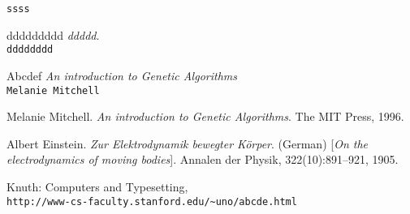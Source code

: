 \begin{thebibliography}{99}

  
\texttt{ssss}

ddddddddd
\textit{ddddd}.\\
\texttt{dddddddd}

Abcdef
\textit{An introduction to Genetic Algorithms}\\
\texttt{Melanie Mitchell}

Melanie Mitchell. 
\textit{An introduction to Genetic Algorithms}. 
The MIT Press, 1996.

Albert Einstein. 
\textit{Zur Elektrodynamik bewegter K{\"o}rper}. (German) 
[\textit{On the electrodynamics of moving bodies}]. 
Annalen der Physik, 322(10):891–921, 1905.

Knuth: Computers and Typesetting,
\\\texttt{http://www-cs-faculty.stanford.edu/\~{}uno/abcde.html}

\end{thebibliography}